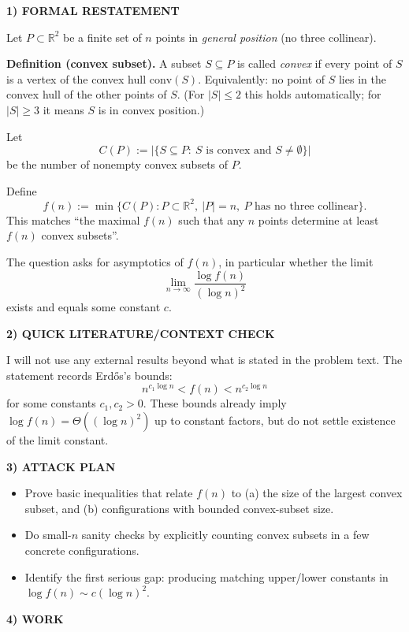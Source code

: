 \medskip
\noindent\textbf{1) FORMAL RESTATEMENT}

Let $P\subset\mathbb R^2$ be a finite set of $n$ points in \emph{general position} (no three collinear).

\textbf{Definition (convex subset).}
A subset $S\subseteq P$ is called \emph{convex} if every point of $S$ is a vertex of the convex hull $\mathrm{conv}(S)$.
Equivalently: no point of $S$ lies in the convex hull of the other points of $S$.
(For $|S|\le 2$ this holds automatically; for $|S|\ge 3$ it means $S$ is in convex position.)

Let
\[
C(P):=\big|\{S\subseteq P:\ S\text{ is convex and }S\neq\emptyset\}\big|
\]
be the number of nonempty convex subsets of $P$.

Define
\[
f(n):=\min\{C(P): P\subset\mathbb R^2,\ |P|=n,\ P\text{ has no three collinear}\}.
\]
This matches ``the maximal $f(n)$ such that any $n$ points determine at least $f(n)$ convex subsets''.

The question asks for asymptotics of $f(n)$, in particular whether the limit
\[
\lim_{n\to\infty}\frac{\log f(n)}{(\log n)^2}
\]
exists and equals some constant $c$.

\medskip
\noindent\textbf{2) QUICK LITERATURE/CONTEXT CHECK}

I will not use any external results beyond what is stated in the problem text.
The statement records Erd\H{o}s's bounds:
\[
n^{c_1\log n}<f(n)< n^{c_2\log n}
\]
for some constants $c_1,c_2>0$.
These bounds already imply $\log f(n)=\Theta((\log n)^2)$ up to constant factors, but do not settle existence of the limit constant.

\medskip
\noindent\textbf{3) ATTACK PLAN}

\begin{itemize}
\item Prove basic inequalities that relate $f(n)$ to (a) the size of the largest convex subset, and (b) configurations with bounded convex-subset size.
\item Do small-$n$ sanity checks by explicitly counting convex subsets in a few concrete configurations.
\item Identify the first serious gap: producing matching upper/lower constants in $\log f(n)\sim c(\log n)^2$.
\end{itemize}

\medskip
\noindent\textbf{4) WORK}

